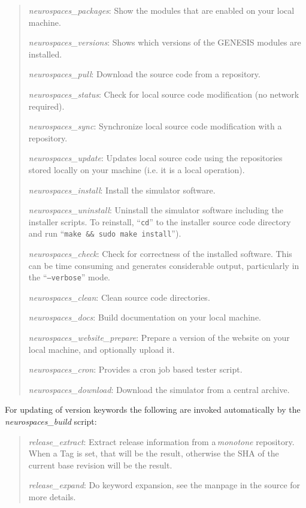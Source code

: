 \documentclass[12pt]{article}
\begin{document}
\begin{quote}
\item {\it neurospaces\_packages}: Show the modules that are enabled on your local machine.
\item {\it neurospaces\_versions}: Shows which versions of the GENESIS modules are installed. 

\item {\it neurospaces\_pull}: Download the source code from a repository.
\item {\it neurospaces\_status}: Check for local source code modification (no network required).
\item {\it neurospaces\_sync}: Synchronize local source code modification with a repository.
\item {\it neurospaces\_update}: Updates local source code using the repositories stored locally on your machine (i.e. it is a local operation). 

\item {\it neurospaces\_install}: Install the simulator software.
\item {\it neurospaces\_uninstall}: Uninstall the simulator software including the installer scripts. To reinstall, ``{\tt cd}'' to the installer source code directory and run ``{\tt make \&\& sudo make install}'').
\item {\it neurospaces\_check}: Check for correctness of the installed software. This can be time consuming and generates considerable output, particularly in the ``{\tt --verbose}'' mode.
\item {\it neurospaces\_clean}: Clean source code directories. 

\item {\it neurospaces\_docs}: Build documentation on your local machine.
\item {\it neurospaces\_website\_prepare}: Prepare a version of the website on your local machine, and optionally upload it. 

\item {\it neurospaces\_cron}: Provides a cron job based tester script.

\item {\it neurospaces\_download}: Download the simulator from a central archive. 
 
 \end{quote}

For updating of version keywords the following are invoked automatically by the\,{\it neurospaces\_build} script:

\begin{quote}
\item {\it release\_extract}: Extract release information from a\,{\it monotone} repository. When a Tag is set, that will be the result, otherwise the SHA of the current base revision will be the result.
\item {\it release\_expand}: Do keyword expansion, see the manpage in the source for more details. 
\end{quote}
\end{document}
